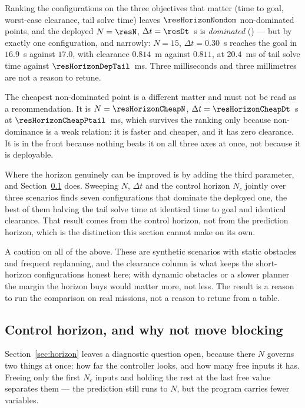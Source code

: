 \documentclass[11pt,a4paper]{article}
\newcommand{\Ninput}{N_c}
\begin{document}
Ranking the configurations on the three objectives that matter (time to goal, worst-case clearance, tail
solve time) leaves $\resHorizonNondom$ non-dominated points, and the deployed $N=\resN$, $\Delta t=\resDt$~s
is \emph{dominated} (\resHorizonDepNondom) --- but by exactly one configuration, and narrowly:
$N=15$, $\Delta t=0.30$~s reaches the goal in $16.9$~s against $17.0$, with clearance $0.814$~m against
$0.811$, at $20.4$~ms of tail solve time against $\resHorizonDepTail$~ms. Three milliseconds and three
millimetres are not a reason to retune.

The cheapest non-dominated point is a different matter and must not be read as a recommendation. It is
$N=\resHorizonCheapN$, $\Delta t=\resHorizonCheapDt$~s at $\resHorizonCheapPtail$~ms, which survives the
ranking only because non-dominance is a weak relation: it is faster and cheaper, and it has zero clearance.
It is in the front because nothing beats it on all three axes at once, not because it is deployable.

Where the horizon genuinely can be improved is by adding the third parameter, and Section~\ref{sec:nc}
does. Sweeping $N$, $\Delta t$ and the control horizon $\Ninput$ jointly over three scenarios finds seven
configurations that dominate the deployed one, the best of them halving the tail solve time at identical time
to goal and identical clearance. That result comes from the control horizon, not from the prediction horizon,
which is the distinction this section cannot make on its own.

A caution on all of the above. These are synthetic scenarios with static obstacles and frequent replanning,
and the clearance column is what keeps the short-horizon configurations honest here; with dynamic obstacles
or a slower planner the margin the horizon buys would matter more, not less. The result is a reason to run
the comparison on real missions, not a reason to retune from a table.

\subsection{Control horizon, and why not move blocking}
\label{sec:nc}

Section~\ref{sec:horizon} leaves a diagnostic question open, because there $N$ governs two things at once:
how far the controller looks, and how many free inputs it has. Freeing only the first $\Ninput$ inputs and
holding the rest at the last free value separates them --- the prediction still runs to $N$, but the program
carries fewer variables.
\end{document}
